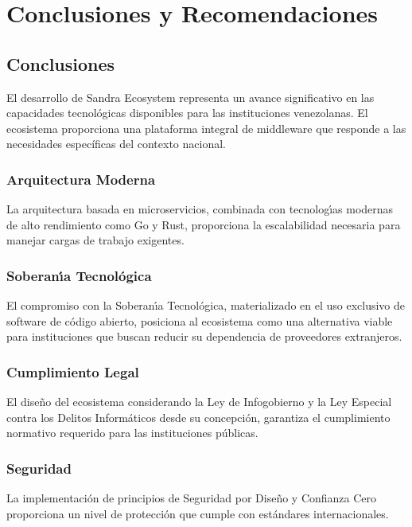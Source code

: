 \chapter{Conclusiones y Recomendaciones}

\section{Conclusiones}

El desarrollo de Sandra Ecosystem representa un avance significativo en las capacidades tecnol\'ogicas disponibles para las instituciones venezolanas. El ecosistema proporciona una plataforma integral de middleware que responde a las necesidades espec\'ificas del contexto nacional.

\subsection{Arquitectura Moderna}
La arquitectura basada en microservicios, combinada con tecnolog\'{\i}as modernas de alto rendimiento como Go y Rust, proporciona la escalabilidad necesaria para manejar cargas de trabajo exigentes.

\subsection{Soberan\'{\i}a Tecnol\'ogica}
El compromiso con la Soberan\'{\i}a Tecnol\'ogica, materializado en el uso exclusivo de software de c\'odigo abierto, posiciona al ecosistema como una alternativa viable para instituciones que buscan reducir su dependencia de proveedores extranjeros.

\subsection{Cumplimiento Legal}
El dise\~no del ecosistema considerando la Ley de Infogobierno y la Ley Especial contra los Delitos Inform\'aticos desde su concepci\'on, garantiza el cumplimiento normativo requerido para las instituciones p\'ublicas.

\subsection{Seguridad}
La implementaci\'on de principios de Seguridad por Dise\~no y Confianza Cero proporciona un nivel de protecci\'on que cumple con est\'andares internacionales.

